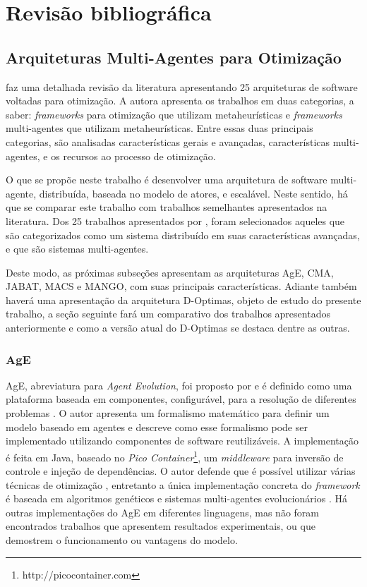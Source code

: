 \chapter{Revisão bibliográfica}
\label{chap:revisao}

\section{Arquiteturas Multi-Agentes para Otimização}
 faz uma detalhada revisão da literatura apresentando 25 arquiteturas de software voltadas para otimização. 
A autora apresenta os trabalhos em duas categorias, a saber: \textit{frameworks} para otimização que utilizam metaheurísticas e \textit{frameworks} multi-agentes que utilizam metaheurísticas. Entre essas duas principais categorias, são analisadas características gerais e avançadas, características multi-agentes, e os recursos ao processo de otimização. 

O que se propõe neste trabalho é desenvolver uma arquitetura de software multi-agente, distribuída, baseada no modelo de atores, e escalável. Neste sentido, há que se comparar este trabalho com trabalhos semelhantes apresentados na literatura. Dos 25 trabalhos apresentados por , foram selecionados aqueles que são categorizados como um sistema distribuído em suas características avançadas, e que são sistemas multi-agentes.

Deste modo, as próximas subseções apresentam as arquiteturas AgE, CMA, JABAT, MACS e MANGO, com suas principais características. Adiante também haverá uma apresentação da arquitetura D-Optimas, objeto de estudo do presente trabalho, a seção seguinte fará um comparativo dos trabalhos apresentados anteriormente e como a versão atual do D-Optimas se destaca dentre as outras.

\subsection{AgE}
AgE, abreviatura para \textit{Agent Evolution}, foi proposto por  e é definido como uma plataforma baseada em componentes, configurável, para a resolução de diferentes problemas \cite{piketak2009functional}. O autor apresenta um formalismo matemático para definir um modelo baseado em agentes e descreve como esse formalismo pode ser implementado utilizando componentes de software reutilizáveis. A implementação é feita em Java, baseado no \textit{Pico Container}\footnote{http://picocontainer.com}, um \textit{middleware} para inversão de controle e injeção de dependências. O autor defende que é possível utilizar várias técnicas de otimização \cite{piketak2013agent}, entretanto a única implementação concreta do \textit{framework} é baseada em algoritmos genéticos e sistemas multi-agentes evolucionários \cite{kisiel2004agent}. Há outras implementações do AgE em diferentes linguagens, mas não foram encontrados trabalhos que apresentem resultados experimentais, ou que demostrem o funcionamento ou vantagens do modelo. 

